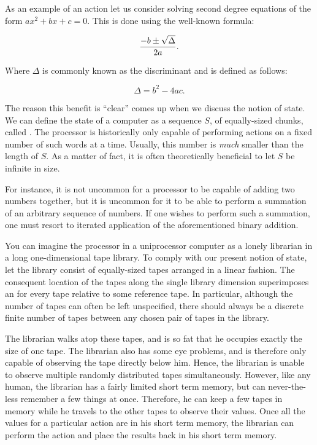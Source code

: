 As an example of an action let us consider solving second degree equations of
the form $ax^2 + bx + c = 0$.  This is done using the well-known formula:

$${-b \pm \sqrt{\Delta} \over 2a}.$$

Where $\Delta$ is commonly known as the discriminant and is defined as follows:

$$ \Delta = b^2 - 4ac.$$

\newpage

The reason this benefit is ``clear'' comes up when we discuss the notion of
state. We can define the state of a computer as a sequence $S$, of
equally-sized chunks, called . The processor is historically only
capable of performing actions on a fixed number of such words at a time.
Usually, this number is \emph{much} smaller than the length of $S$. As a matter
of fact, it is often theoretically beneficial to let $S$ be infinite in size.

For instance, it is not uncommon for a processor to be capable of adding two
numbers together, but it is uncommon for it to be able to perform a summation
of an arbitrary sequence of numbers. If one wishes to perform such a summation,
one must resort to iterated application of the aforementioned binary addition. 

You can imagine the processor in a uniprocessor computer as a lonely librarian
in a long one-dimensional tape library. To comply with our present notion of
state, let the library consist of equally-sized tapes arranged in a linear
fashion. The consequent location of the tapes along the single library
dimension superimposes an  for every tape relative to some
reference tape. In particular, although the number of tapes can often be left
unspecified, there should always be a discrete finite number of tapes between
any chosen pair of tapes in the library.

The librarian walks atop these tapes, and is so fat that he occupies exactly
the size of one tape. The librarian also has some eye problems, and is
therefore only capable of observing the tape directly below him. Hence, the
librarian is unable to observe multiple randomly distributed tapes
simultaneously. However, like any human, the librarian has a fairly limited
short term memory, but can never-the-less remember a few things at once.
Therefore, he can keep a few tapes in memory while he travels to the other
tapes to observe their values. Once all the values for a particular action are
in his short term memory, the librarian can perform the action and place the
results back in his short term memory.

